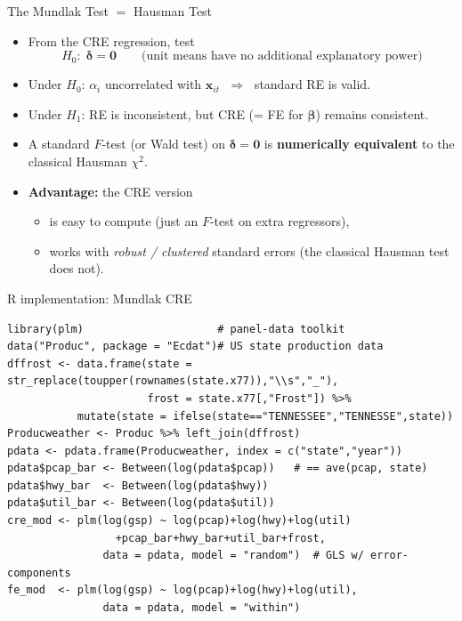 \documentclass[aspectratio=169, handout, t]{beamer}
\numberwithin{equation}{section}
\begin{document}
\begin{frame}{The Mundlak Test $=$ Hausman Test}
\begin{itemize}
  \item From the CRE regression, test
    \[
      H_0\!:\; \bm{\delta} = \bm{0}
      \qquad\text{(unit means have no additional explanatory power)}
    \]
  \item Under $H_0$: $\alpha_i$ uncorrelated with $\bm{x}_{it}$
        $\;\Rightarrow\;$ standard RE is valid.
  \item Under $H_1$: RE is inconsistent, but CRE (= FE for $\bm{\beta}$)
        remains consistent.\pause
  \item A standard $F$-test (or Wald test) on $\bm{\delta}=\bm{0}$ is
        \textbf{numerically equivalent} to the classical Hausman $\chi^2$.
  \item \textbf{Advantage:} the CRE version
    \begin{itemize}
      \item is easy to compute (just an $F$-test on extra regressors),
      \item works with \emph{robust / clustered} standard errors
            (the classical Hausman test does not).
    \end{itemize}
\end{itemize}
\end{frame}

\begin{frame}[fragile]{R implementation: Mundlak CRE}
\begin{lstlisting}
library(plm)                     # panel-data toolkit
data("Produc", package = "Ecdat")# US state production data
dffrost <- data.frame(state = str_replace(toupper(rownames(state.x77)),"\\s","_"),
                      frost = state.x77[,"Frost"]) %>%
           mutate(state = ifelse(state=="TENNESSEE","TENNESSE",state))
Producweather <- Produc %>% left_join(dffrost)
pdata <- pdata.frame(Producweather, index = c("state","year"))
pdata$pcap_bar <- Between(log(pdata$pcap))   # == ave(pcap, state)
pdata$hwy_bar  <- Between(log(pdata$hwy))
pdata$util_bar <- Between(log(pdata$util))
cre_mod <- plm(log(gsp) ~ log(pcap)+log(hwy)+log(util)
                 +pcap_bar+hwy_bar+util_bar+frost,
               data = pdata, model = "random")  # GLS w/ error-components
fe_mod  <- plm(log(gsp) ~ log(pcap)+log(hwy)+log(util),
               data = pdata, model = "within")
\end{lstlisting}
\end{frame}
\end{document}
